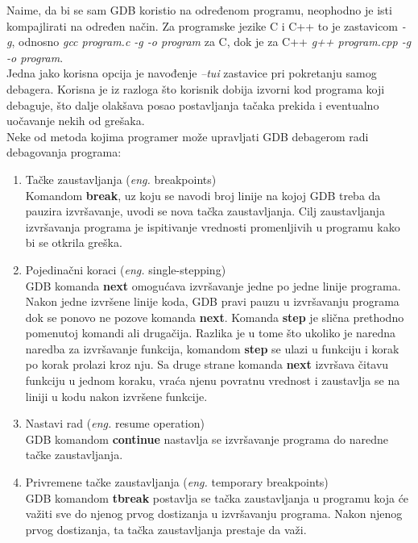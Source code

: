 \documentclass[a4paper]{article}
\begin{document}
Naime, da bi se sam GDB koristio na određenom programu, neophodno je isti kompajlirati 
na određen način. Za programske jezike C i C++ to je zastavicom \textit{-g}, odnosno
\textit{gcc program.c -g -o program} za C, dok je za C++ \textit{g++ program.cpp -g -o program}.\\
Jedna jako korisna opcija je navođenje \textit{--tui} zastavice pri pokretanju samog debagera. 
Korisna je iz razloga što korisnik dobija izvorni kod programa koji debaguje, što dalje olakšava posao postavljanja
tačaka prekida i eventualno uočavanje nekih od grešaka\cite{oReilly}.\\
Neke od metoda kojima programer može upravljati GDB debagerom radi debagovanja programa:\cite{art_debugging}
\begin{enumerate}
\item Tačke zaustavljanja (\textit{eng.} breakpoints) \\
Komandom \textbf{break}, uz koju se navodi broj linije na kojoj GDB treba da pauzira izvršavanje, 
uvodi se nova tačka zaustavljanja. Cilj zaustavljanja izvršavanja programa je ispitivanje vrednosti
promenljivih u programu kako bi se otkrila greška.
\item Pojedinačni koraci (\textit{eng.} single-stepping)\\
GDB komanda \textbf{next} omogućava izvršavanje jedne po jedne linije programa. 
Nakon jedne izvršene linije koda, GDB pravi pauzu u izvršavanju programa dok se ponovo ne 
pozove komanda \textbf{next}. Komanda \textbf{step} je slična prethodno pomenutoj 
komandi ali drugačija. Razlika je u tome što ukoliko je naredna naredba za izvršavanje funkcija, 
komandom \textbf{step} se ulazi u funkciju i korak po korak prolazi kroz nju. Sa druge strane 
komanda \textbf{next} izvršava čitavu funkciju u jednom koraku, vraća njenu povratnu 
vrednost i zaustavlja se na liniji u kodu nakon izvršene funkcije.
\item Nastavi rad (\textit{eng.} resume operation)\\
GDB komandom \textbf{continue} nastavlja se izvršavanje programa do naredne tačke zaustavljanja. 
\item Privremene tačke zaustavljanja (\textit{eng.} temporary breakpoints)\\
GDB komandom \textbf{tbreak} postavlja se tačka zaustavljanja u programu koja će važiti 
sve do njenog prvog dostizanja u izvršavanju programa. Nakon njenog prvog dostizanja, 
ta tačka zaustavljanja prestaje da važi. 
\end{enumerate}
\end{document}
